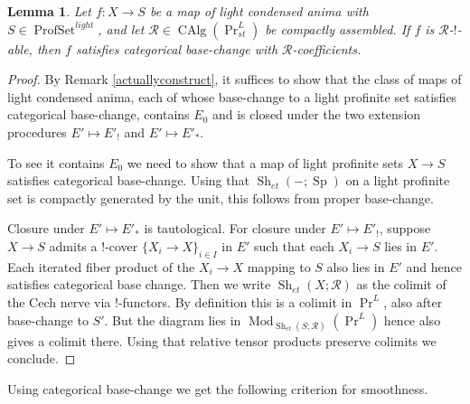 \documentclass[12pt]{article}
\newtheorem{lemma}[theorem]{Lemma}
\newcommand{\on}{\operatorname}
\begin{document}
\begin{lemma}
Let $f:X\to S$ be a map of light condensed anima with $S\in\on{ProfSet}^{light}$, and let $\mathcal{R}\in\on{CAlg}(\on{Pr}^L_{st})$ be compactly assembled.  If $f$ is $\mathcal{R}$-$!$-able, then $f$ satisfies categorical base-change with $\mathcal{R}$-coefficients.
\end{lemma}
\begin{proof}
By Remark \ref{actuallyconstruct}, it suffices to show that the class of maps of light condensed anima, each of whose base-change to a light profinite set satisfies categorical base-change, contains $E_0$ and is closed under the two extension procedures $E'\mapsto E'_!$ and $E'\mapsto E'_\ast$.

To see it contains $E_0$ we need to show that a map of light profinite sets $X\to S$ satisfies categorical base-change.  Using that $\on{Sh}_{et}(-;\on{Sp})$ on a light profinite set is compactly generated by the unit, this follows from proper base-change.

Closure under $E'\mapsto E'_\ast$ is tautological.  For closure under $E'\mapsto E'_!$,  suppose $X\to S$ admits a $!$-cover $\{X_i\to X\}_{i\in I}$ in $E'$ such that each $X_i\to S$ lies in $E'$.  Each iterated fiber product of the $X_i\to X$ mapping to $S$ also lies in $E'$ and hence satisfies categorical base change.  Then we write $\on{Sh}_{et}(X;\mathcal{R})$ as the colimit of the Cech nerve via $!$-functors.  By definition this is a colimit in $\on{Pr}^L$, also after base-change to $S'$.  But the diagram lies in $\on{Mod}_{\on{Sh}_{et}(S;\mathcal{R})}(\on{Pr}^L)$ hence also gives a colimit there.   Using that relative tensor products preserve colimits we conclude.
\end{proof}

Using categorical base-change we get the following criterion for smoothness.
\end{document}
